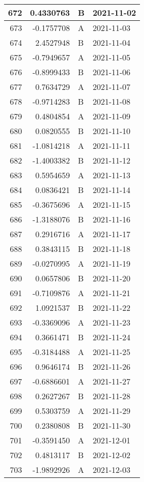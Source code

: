 \begin{tabular}{r|r|l|l}
\hline
672 & 0.4330763 & B & 2021-11-02\\
\hline
673 & -0.1757708 & A & 2021-11-03\\
\hline
674 & 2.4527948 & B & 2021-11-04\\
\hline
675 & -0.7949657 & A & 2021-11-05\\
\hline
676 & -0.8999433 & B & 2021-11-06\\
\hline
677 & 0.7634729 & A & 2021-11-07\\
\hline
678 & -0.9714283 & B & 2021-11-08\\
\hline
679 & 0.4804854 & A & 2021-11-09\\
\hline
680 & 0.0820555 & B & 2021-11-10\\
\hline
681 & -1.0814218 & A & 2021-11-11\\
\hline
682 & -1.4003382 & B & 2021-11-12\\
\hline
683 & 0.5954659 & A & 2021-11-13\\
\hline
684 & 0.0836421 & B & 2021-11-14\\
\hline
685 & -0.3675696 & A & 2021-11-15\\
\hline
686 & -1.3188076 & B & 2021-11-16\\
\hline
687 & 0.2916716 & A & 2021-11-17\\
\hline
688 & 0.3843115 & B & 2021-11-18\\
\hline
689 & -0.0270995 & A & 2021-11-19\\
\hline
690 & 0.0657806 & B & 2021-11-20\\
\hline
691 & -0.7109876 & A & 2021-11-21\\
\hline
692 & 1.0921537 & B & 2021-11-22\\
\hline
693 & -0.3369096 & A & 2021-11-23\\
\hline
694 & 0.3661471 & B & 2021-11-24\\
\hline
695 & -0.3184488 & A & 2021-11-25\\
\hline
696 & 0.9646174 & B & 2021-11-26\\
\hline
697 & -0.6886601 & A & 2021-11-27\\
\hline
698 & 0.2627267 & B & 2021-11-28\\
\hline
699 & 0.5303759 & A & 2021-11-29\\
\hline
700 & 0.2380808 & B & 2021-11-30\\
\hline
701 & -0.3591450 & A & 2021-12-01\\
\hline
702 & 0.4813117 & B & 2021-12-02\\
\hline
703 & -1.9892926 & A & 2021-12-03\\

\end{tabular}
